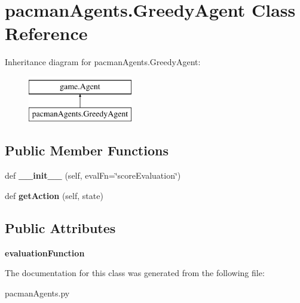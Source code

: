 \hypertarget{classpacman_agents_1_1_greedy_agent}{}\section{pacman\+Agents.\+Greedy\+Agent Class Reference}
\label{classpacman_agents_1_1_greedy_agent}
Inheritance diagram for pacman\+Agents.\+Greedy\+Agent\+:\begin{figure}[H]
\begin{center}
\leavevmode
\includegraphics[height=2.000000cm]{classpacman_agents_1_1_greedy_agent}
\end{center}
\end{figure}
\subsection*{Public Member Functions}
\begin{DoxyCompactItemize}
\item 
\mbox{\label{classpacman_agents_1_1_greedy_agent_ab1b3b7a06301b7382668a18ddcae3d73}} 
def {\bfseries \+\_\+\+\_\+init\+\_\+\+\_\+} (self, eval\+Fn=\char`\"{}score\+Evaluation\char`\"{})
\item 
\mbox{\label{classpacman_agents_1_1_greedy_agent_a55f39125cdcb5c991ac8989b4ca9c4dd}} 
def {\bfseries get\+Action} (self, state)
\end{DoxyCompactItemize}
\subsection*{Public Attributes}
\begin{DoxyCompactItemize}
\item 
\mbox{\label{classpacman_agents_1_1_greedy_agent_aa1bd3b90476cee8214e9b0a8f7109a01}} 
{\bfseries evaluation\+Function}
\end{DoxyCompactItemize}


The documentation for this class was generated from the following file\+:\begin{DoxyCompactItemize}
\item 
pacman\+Agents.\+py\end{DoxyCompactItemize}
